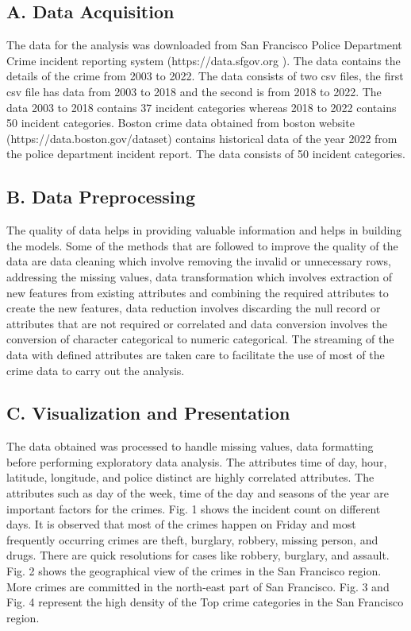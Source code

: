 \documentclass[11 pt,conference,final,]{IEEEtran}
\begin{document}
\subsection{A. Data Acquisition}\label{a.-data-acquisition}

The data for the analysis was downloaded from San Francisco Police
Department Crime incident reporting system (https://data.sfgov.org ).
The data contains the details of the crime from 2003 to 2022. The data
consists of two csv files, the first csv file has data from 2003 to 2018
and the second is from 2018 to 2022. The data 2003 to 2018 contains 37
incident categories whereas 2018 to 2022 contains 50 incident
categories. Boston crime data obtained from boston website
(https://data.boston.gov/dataset) contains historical data of the year
2022 from the police department incident report. The data consists of 50
incident categories.

\subsection{B. Data Preprocessing}\label{b.-data-preprocessing}

The quality of data helps in providing valuable information and helps in
building the models. Some of the methods that are followed to improve
the quality of the data are data cleaning which involve removing the
invalid or unnecessary rows, addressing the missing values, data
transformation which involves extraction of new features from existing
attributes and combining the required attributes to create the new
features, data reduction involves discarding the null record or
attributes that are not required or correlated and data conversion
involves the conversion of character categorical to numeric categorical.
The streaming of the data with defined attributes are taken care to
facilitate the use of most of the crime data to carry out the analysis.

\subsection{C. Visualization and
Presentation}\label{c.-visualization-and-presentation}

The data obtained was processed to handle missing values, data
formatting before performing exploratory data analysis. The attributes
time of day, hour, latitude, longitude, and police distinct are highly
correlated attributes. The attributes such as day of the week, time of
the day and seasons of the year are important factors for the crimes.
Fig. 1 shows the incident count on different days. It is observed that
most of the crimes happen on Friday and most frequently occurring crimes
are theft, burglary, robbery, missing person, and drugs. There are quick
resolutions for cases like robbery, burglary, and assault. Fig. 2 shows
the geographical view of the crimes in the San Francisco region. More
crimes are committed in the north-east part of San Francisco. Fig. 3 and
Fig. 4 represent the high density of the Top crime categories in the San
Francisco region.
\end{document}
